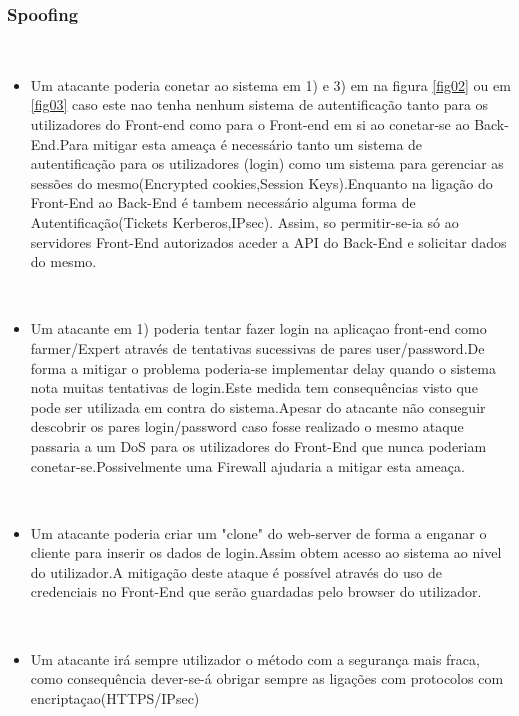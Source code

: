 \subsubsection{Spoofing}
\label{Spoofing}
\hfill\\
\begin{itemize}

\item Um atacante poderia conetar ao sistema em 1) e 3) em  na figura \ref{fig02} ou em \ref{fig03} caso este nao tenha nenhum sistema de autentificação tanto para os utilizadores do Front-end como para o Front-end em si ao conetar-se ao Back-End.Para mitigar esta ameaça é necessário tanto um sistema de autentificação para os utilizadores (login) como um sistema para gerenciar as sessões do mesmo(Encrypted cookies,Session Keys).Enquanto na ligação do Front-End ao Back-End é tambem necessário alguma forma de Autentificação(Tickets Kerberos,IPsec). Assim, so permitir-se-ia só ao servidores Front-End autorizados aceder a API do Back-End e solicitar dados do mesmo.

\hfill\\
\item Um atacante em 1) poderia tentar fazer login na aplicaçao front-end como farmer/Expert através de tentativas sucessivas de pares user/password.De forma a mitigar o problema poderia-se implementar delay quando o sistema nota muitas tentativas de login.Este medida tem consequências visto que pode ser utilizada em contra do sistema.Apesar do atacante não conseguir descobrir os pares login/password caso fosse realizado o mesmo ataque passaria a um DoS para os utilizadores do Front-End que nunca poderiam conetar-se.Possivelmente uma Firewall ajudaria a mitigar esta ameaça.

\hfill\\
\item Um atacante poderia criar um "clone" do web-server de forma a enganar o cliente para inserir os dados de login.Assim obtem acesso ao sistema ao nivel do utilizador.A mitigação deste ataque é possível através do uso de credenciais no Front-End que serão guardadas pelo browser do utilizador. 

\hfill\\
\item Um atacante irá sempre utilizador o método com a segurança mais fraca, como consequência dever-se-á obrigar sempre as ligações com protocolos com encriptaçao(HTTPS/IPsec)

\end{itemize}

